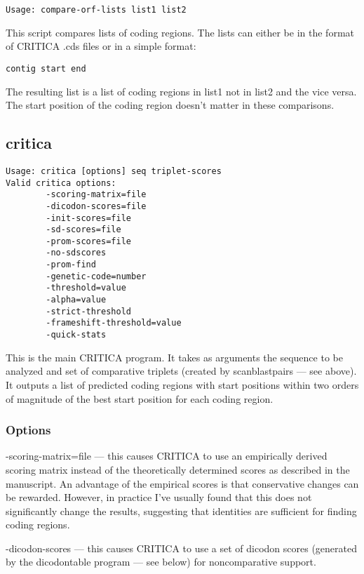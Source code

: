 \documentclass{article}
\begin{document}
\begin{verbatim}
Usage: compare-orf-lists list1 list2
\end{verbatim}

This script compares lists of coding regions. The lists can either be
in the format of CRITICA .cds files or in a simple format: 

\begin{verbatim}  
contig start end
\end{verbatim}

The resulting list is a list of coding regions in list1 not in list2
and the vice versa. The start position of the coding region doesn't
matter in these comparisons.

\subsection{critica}

\begin{verbatim}
Usage: critica [options] seq triplet-scores
Valid critica options:
        -scoring-matrix=file
        -dicodon-scores=file
        -init-scores=file
        -sd-scores=file
        -prom-scores=file
        -no-sdscores
        -prom-find
        -genetic-code=number
        -threshold=value
        -alpha=value
        -strict-threshold
        -frameshift-threshold=value
        -quick-stats
\end{verbatim}

This is the main CRITICA program. It takes as arguments the sequence
to be analyzed and set of comparative triplets (created by
scanblastpairs --- see above). It outputs a list of predicted
coding regions with start positions within two orders of magnitude of
the best start position for each coding region.

\subsubsection*{Options}

\noindent -scoring-matrix=file --- this causes CRITICA to use
an empirically derived scoring matrix instead of the theoretically
determined scores as described in the manuscript. An advantage of the
empirical scores is that conservative changes can be
rewarded. However, in practice I've usually found that this does not
significantly change the results, suggesting that identities are
sufficient for finding coding regions.

\bigskip \noindent -dicodon-scores --- this causes CRITICA to
use a set of dicodon scores (generated by the dicodontable
program --- see below) for noncomparative support.
\end{document}
